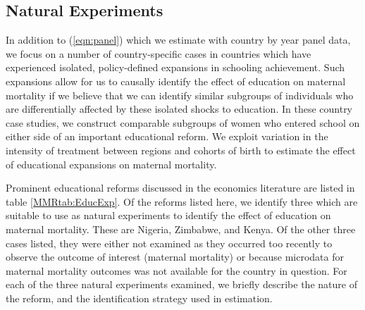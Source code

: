 \documentclass{article}[12pt,subeqn]
\begin{document}
\begin{spacing}{1.4}
\subsection{Natural Experiments}
\label{scn:empiricalexperiment}
In addition to (\ref{eqn:panel}) which we estimate with country by year panel
data, we focus on a number of country-specific cases in countries which have
experienced isolated, policy-defined expansions in schooling achievement. Such
expansions allow for us to causally identify the effect of education on maternal
mortality if we believe that we can identify similar subgroups of individuals
who are differentially affected by these isolated shocks to education. In these
country case studies, we construct comparable subgroups of women who entered
school on either side of an important educational reform.  We exploit variation
in the intensity of treatment between regions and cohorts of birth to estimate
the effect of educational expansions on maternal mortality.

Prominent educational reforms discussed in the economics literature are listed 
in table \ref{MMRtab:EducExp}.  Of the reforms listed here, we identify 
three which are suitable to use as natural experiments to identify the effect of 
education on maternal mortality.  These are Nigeria, Zimbabwe, and Kenya. Of the 
other three cases listed, they were either not examined as they occurred too 
recently to observe the outcome of interest (maternal mortality) or because 
microdata for maternal mortality outcomes was not available for the country in 
question. For each of the three natural experiments examined, we briefly describe 
the nature of the reform, and the identification strategy used in estimation.


\end{spacing}
\end{document}
